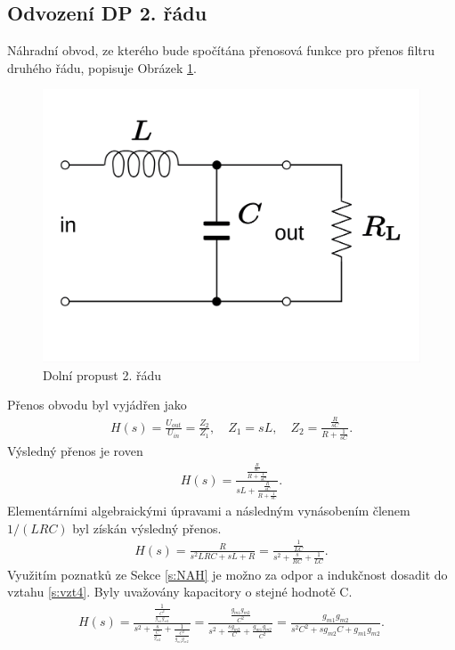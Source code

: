 \subsection{Odvození DP 2. řádu}\label{s:ODV}
\noindent Náhradní obvod, ze kterého bude spočítána přenosová funkce pro přenos filtru druhého řádu, popisuje Obrázek \ref{s:DPO}.
\begin{figure}[h]
\centering
\includegraphics[scale=0.15]{RLC_low-pass.png}
\caption[Dolní propust 2. řádu]{Dolní propust 2. řádu \cite{11} \label{s:DPO}}
\end{figure}
\noindent Přenos obvodu byl vyjádřen jako
\begin{align}
H(s) = \frac{U_{out}}{U_{in}} = \frac{Z_2}{Z_1}, \quad Z_1 = sL,\quad Z_2 = \frac{\frac{R}{sC}}{R + \frac{1}{sC}}.
\end{align}
Výsledný přenos je roven 
\begin{align}
H(s) = \frac{\frac{\frac{R}{sC}}{R + \frac{1}{sC}}}{sL + \frac{\frac{R}{sC}}{R + \frac{1}{sC}}}.
\end{align}
Elementárními algebraickými úpravami a následným vynásobením členem $1/(LRC)$ byl získán výsledný přenos.
\begin{align}\label{s:vzt4}
H(s) = \frac{R}{s^2LRC + sL + R} = \frac{\frac{1}{LC}}{s^2 + \frac{s}{RC} + \frac{1}{LC}}.
\end{align}
\noindent Využitím poznatků ze Sekce \ref{s:NAH} je možno za odpor a indukčnost dosadit do vztahu \ref{s:vzt4}. Byly uvažovány kapacitory o stejné hodnotě C.
\begin{align}
H(s) = \frac{\frac{1}{\frac{C^2}{g_{m1}g_{m2}}}}{s^2 + \frac{s}{\frac{C}{g_{m2}}} + \frac{1}{\frac{C^2}{g_{m1}g_{m2}}}} = \frac{\frac{g_{m1}g_{m2}}{C^2}}{s^2 + \frac{sg_{m2}}{C} + \frac{g_{m1}g_{m2}}{C^2}} = \frac{g_{m1}g_{m2}}{s^2C^2 + sg_{m2}C + g_{m1}g_{m2}}.
\end{align}
